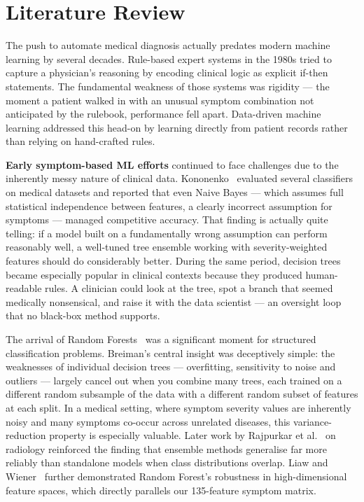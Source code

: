\documentclass[12pt,a4paper]{article}
\begin{document}
\section{Literature Review}

The push to automate medical diagnosis actually predates modern machine learning by several decades. Rule-based expert systems in the 1980s tried to capture a physician's reasoning by encoding clinical logic as explicit if-then statements. The fundamental weakness of those systems was rigidity --- the moment a patient walked in with an unusual symptom combination not anticipated by the rulebook, performance fell apart. Data-driven machine learning addressed this head-on by learning directly from patient records rather than relying on hand-crafted rules.

\textbf{Early symptom-based ML efforts} continued to face challenges due to the inherently messy nature of clinical data. Kononenko~\cite{kononenko2001} evaluated several classifiers on medical datasets and reported that even Naive Bayes --- which assumes full statistical independence between features, a clearly incorrect assumption for symptoms --- managed competitive accuracy. That finding is actually quite telling: if a model built on a fundamentally wrong assumption can perform reasonably well, a well-tuned tree ensemble working with severity-weighted features should do considerably better. During the same period, decision trees~\cite{quinlan1986} became especially popular in clinical contexts because they produced human-readable rules. A clinician could look at the tree, spot a branch that seemed medically nonsensical, and raise it with the data scientist --- an oversight loop that no black-box method supports.

The arrival of Random Forests~\cite{breiman2001} was a significant moment for structured classification problems. Breiman's central insight was deceptively simple: the weaknesses of individual decision trees --- overfitting, sensitivity to noise and outliers --- largely cancel out when you combine many trees, each trained on a different random subsample of the data with a different random subset of features at each split. In a medical setting, where symptom severity values are inherently noisy and many symptoms co-occur across unrelated diseases, this variance-reduction property is especially valuable. Later work by Rajpurkar et al.~\cite{rajpurkar2017} on radiology reinforced the finding that ensemble methods generalise far more reliably than standalone models when class distributions overlap. Liaw and Wiener~\cite{liaw2002} further demonstrated Random Forest's robustness in high-dimensional feature spaces, which directly parallels our 135-feature symptom matrix.
\end{document}
